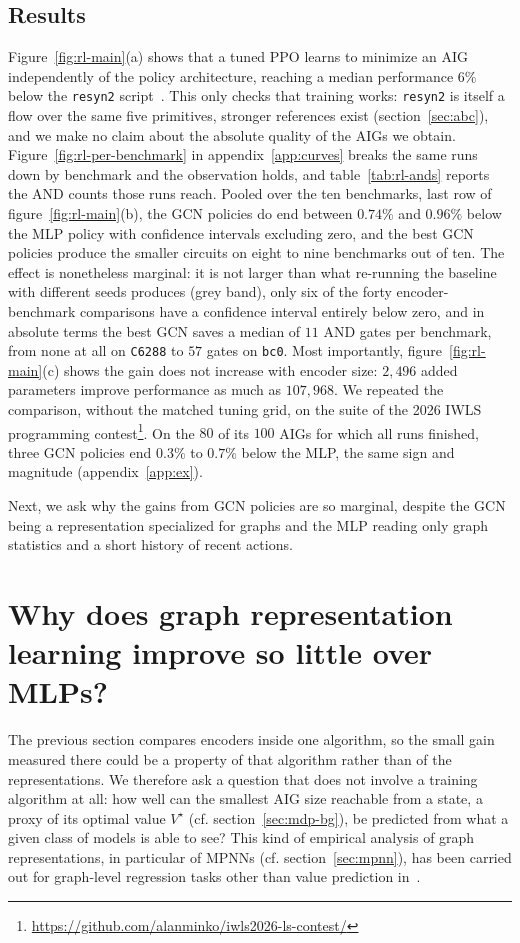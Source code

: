 \documentclass{article}
\begin{document}
\subsection{Results}
Figure~\ref{fig:rl-main}(a) shows that a tuned PPO learns to minimize an AIG
independently of the policy architecture, reaching a median performance $6\%$ below the
\texttt{resyn2} script~\cite{rewriting}.
This only checks that training works: \texttt{resyn2} is itself a flow over the same five
primitives, stronger references exist (section~\ref{sec:abc}), and we make no claim about
the absolute quality of the AIGs we obtain.
Figure~\ref{fig:rl-per-benchmark} in appendix~\ref{app:curves} breaks the same runs down by benchmark and the observation holds, and
table~\ref{tab:rl-ands} reports the AND counts those runs reach.
Pooled over the ten benchmarks, last row of figure~\ref{fig:rl-main}(b), the GCN policies do end between
$0.74\%$ and $0.96\%$ below the MLP policy with confidence intervals excluding zero, and
the best GCN policies produce the smaller circuits on eight to nine benchmarks out of
ten. The effect is nonetheless marginal: it is not larger than what
re-running the baseline with different seeds produces (grey band), only six of the
forty encoder-benchmark comparisons have a confidence interval entirely below zero,
and in absolute terms the best GCN saves a median of $11$ AND gates per benchmark,
from none at all on \texttt{C6288} to $57$ gates on
\texttt{bc0}. Most importantly, figure~\ref{fig:rl-main}(c) shows the gain does not increase with encoder size: $2{,}496$ added parameters improve performance as much as $107{,}968$.
We repeated the comparison, without the matched tuning grid, on the suite of the 2026 IWLS programming
contest\footnote{\url{https://github.com/alanminko/iwls2026-ls-contest/}}. On the $80$ of its $100$ AIGs for which all runs finished,
three GCN policies end $0.3\%$ to $0.7\%$ below the MLP, the same sign and magnitude (appendix~\ref{app:ex}).

Next, we ask why the gains from GCN policies are so marginal, despite the GCN being a representation specialized for graphs and the MLP reading only graph statistics and a short history of recent actions.

\section{Why does graph representation learning improve so little over MLPs?}\label{sec:value}
The previous section compares encoders inside one algorithm, so the small gain measured there could be a property of that algorithm rather than of the representations.
We therefore ask a question that does not involve a training algorithm at all: how well can the smallest AIG size reachable from a state, a proxy of its optimal value $V^\star$ (cf. section~\ref{sec:mdp-bg}), be predicted from what a given class of models is able to see?
This kind of empirical analysis of graph representations, in particular of MPNNs (cf. section~\ref{sec:mpnn}), has been carried out for graph-level regression tasks other than value prediction in~\citet{graphtester}.
\end{document}
